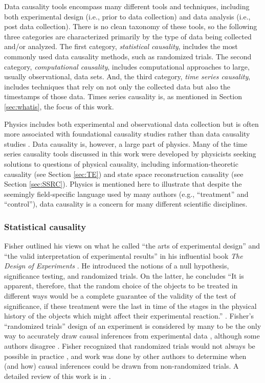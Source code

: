 \documentclass{article}[10pt]
\begin{document}
Data causality tools encompass many different tools and techniques, including both experimental design (i.e., prior to data collection) and data analysis (i.e., post data collection).  There is no clean taxonomy of these tools, so the following three categories are characterized primarily by the type of data being collected and/or analyzed.  The first category, {\em statistical causality}, includes the most commonly used data causality methods, such as randomized trials.  The second category, {\em computational causality}, includes computational approaches to large, usually observational, data sets.  And, the third category, {\em time series causality}, includes techniques that rely on not only the collected data but also the timestamps of those data.  Times series causality is, as mentioned in Section \ref{sec:whatis}, the focus of this work.

Physics includes both experimental and observational data collection but is often more associated with foundational causality studies rather than data causality studies \cite{Bunge1979,Bohm1971,Penrose1999}.  Data causality is, however, a large part of physics.  Many of the time series causality tools discussed in this work were developed by physicists seeking solutions to questions of physical causality, including information-theoretic causality (see Section \ref{sec:TE}) and state space reconstruction causality (see Section \ref{sec:SSRC}).  Physics is mentioned here to illustrate that despite the seemingly field-specific language used by many authors (e.g., ``treatment'' and ``control''), data causality is a concern for many different scientific disciplines.  

\subsubsection{Statistical causality} 
Fisher outlined his views on what he called ``the arts of experimental design'' and ``the valid interpretation of experimental results'' in his influential book {\em The Design of Experiments} \cite{Fisher1960}.  He introduced the notions of a null hypothesis, significance testing, and randomized trials.  On the latter, he concludes ``It is apparent, therefore, that the random choice of the objects to be treated in different ways would be a complete guarantee of the validity of the test of significance, if these treatment were the last in time of the stages in the physical history of the objects which might affect their experimental reaction.'' \cite{Fisher1960}.  Fisher's ``randomized trials'' design of an experiment is considered by many to be the only way to accurately draw causal inferences from experimental data \cite{Imbens2015,Morgan2014}, although some authors disagree \cite{Pearl2000}.  Fisher recognized that randomized trials would not always be possible in practice \cite{Fisher1960}, and work was done by other authors to determine when (and how) causal inferences could be drawn from non-randomized trials.  A detailed review of this work is in \cite{Morgan2014}.
\end{document}
